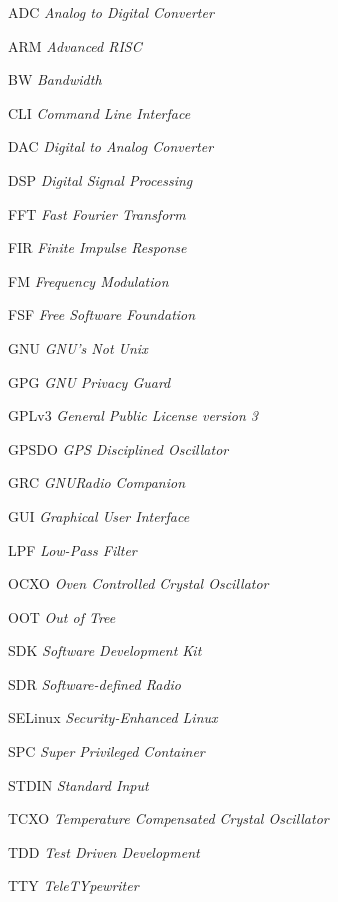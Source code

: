 \documentclass[
  12pt,				%
  openright,			%
  twoside,			%
  a4paper,			%
  english,			%
  french,				%
  spanish,			%
  brazil,				%
  ]{abntex2}
\begin{document}
\begin{siglas}

  \item[ADC]         \textit{Analog to Digital Converter}
  \item[ARM]        \textit{Advanced RISC}
  \item[BW]         \textit{Bandwidth}
  \item[CLI]        \textit{Command Line Interface}
  \item[DAC]        \textit{Digital to Analog Converter}
  \item[DSP]        \textit{Digital Signal Processing}
  \item[FFT]        \textit{Fast Fourier Transform}
  \item[FIR]        \textit{Finite Impulse Response}
  \item[FM]         \textit{Frequency Modulation}
  \item[FSF]        \textit{Free Software Foundation}
  \item[GNU]        \textit{GNU's Not Unix}
  \item[GPG]        \textit{GNU Privacy Guard}
  \item[GPLv3]      \textit{General Public License version 3}
  \item[GPSDO]      \textit{GPS Disciplined Oscillator}
  \item[GRC]        \textit{GNURadio Companion}
  \item[GUI]        \textit{Graphical User Interface}
  \item[LPF]        \textit{Low-Pass Filter}
  \item[OCXO]       \textit{Oven Controlled Crystal Oscillator}
  \item[OOT]        \textit{Out of Tree}
  \item[SDK]        \textit{Software Development Kit}
  \item[SDR]        \textit{Software-defined Radio}
  \item[SELinux]    \textit{Security-Enhanced Linux}
  \item[SPC]        \textit{Super Privileged Container}
  \item[STDIN]      \textit{Standard Input}
  \item[TCXO]       \textit{Temperature Compensated Crystal Oscillator}
  \item[TDD]        \textit{Test Driven Development}
  \item[TTY]        \textit{TeleTYpewriter}

\end{siglas}
\end{document}
